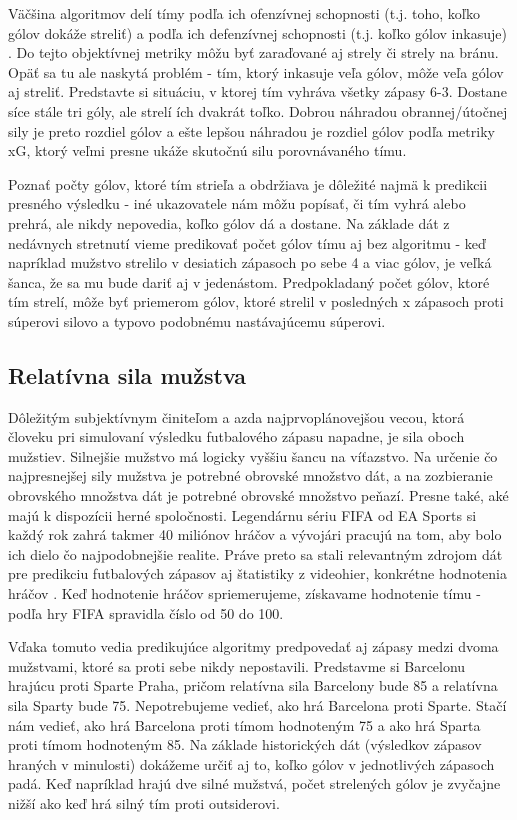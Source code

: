 \documentclass[10pt,twoside,slovak,a4paper]{article}
\begin{document}
Väčšina algoritmov delí tímy podľa ich ofenzívnej schopnosti (t.j. toho, koľko gólov dokáže streliť) a podľa ich defenzívnej schopnosti (t.j. koľko gólov inkasuje) \cite{dixon1997modelling} \cite{razali2017predicting}. Do tejto objektívnej metriky môžu byť zaraďované aj strely či strely na bránu. Opäť sa tu ale naskytá problém - tím, ktorý inkasuje veľa gólov, môže veľa gólov aj streliť. Predstavte si situáciu, v ktorej tím vyhráva všetky zápasy 6-3. Dostane síce stále tri góly, ale strelí ích dvakrát toľko. Dobrou náhradou obrannej/útočnej sily je preto rozdiel gólov a ešte lepšou náhradou je rozdiel gólov podľa metriky xG, ktorý veľmi presne ukáže skutočnú silu porovnávaného tímu.

Poznať počty gólov, ktoré tím strieľa a obdržiava je dôležité najmä k predikcii presného výsledku - iné ukazovatele nám môžu popísať, či tím vyhrá alebo prehrá, ale nikdy nepovedia, koľko gólov dá a dostane. Na základe dát z nedávnych stretnutí vieme predikovať počet gólov tímu aj bez algoritmu - keď napríklad mužstvo strelilo v desiatich zápasoch po sebe 4 a viac gólov, je veľká šanca, že sa mu bude dariť aj v jedenástom. Predpokladaný počet gólov, ktoré tím strelí, môže byť priemerom gólov, ktoré strelil v posledných x zápasoch proti súperovi silovo a typovo podobnému nastávajúcemu súperovi.

\subsection{Relatívna sila mužstva}

Dôležitým subjektívnym činiteľom a azda najprvoplánovejšou vecou, ktorá človeku pri simulovaní výsledku futbalového zápasu napadne, je sila oboch mužstiev. Silnejšie mužstvo má logicky vyššiu šancu na víťazstvo. Na určenie čo najpresnejšej sily mužstva je potrebné obrovské množstvo dát, a na zozbieranie obrovského množstva dát je potrebné obrovské množstvo peňazí. Presne také, aké majú k dispozícii herné spoločnosti. Legendárnu sériu FIFA od EA Sports si každý rok zahrá takmer 40 miliónov hráčov a vývojári pracujú na tom, aby bolo ich dielo čo najpodobnejšie realite. Práve preto sa stali relevantným zdrojom dát pre predikciu futbalových zápasov aj štatistiky z videohier, konkrétne hodnotenia hráčov \cite{shin2014novel}. Keď hodnotenie hráčov spriemerujeme, získavame hodnotenie tímu - podľa hry FIFA spravidla číslo od 50 do 100.

Vďaka tomuto vedia predikujúce algoritmy predpovedať aj zápasy medzi dvoma mužstvami, ktoré sa proti sebe nikdy nepostavili. Predstavme si Barcelonu hrajúcu proti Sparte Praha, pričom relatívna sila Barcelony bude 85 a relatívna sila Sparty bude 75. Nepotrebujeme vedieť, ako hrá Barcelona proti Sparte. Stačí nám vedieť, ako hrá Barcelona proti tímom hodnoteným 75 a ako hrá Sparta proti tímom hodnoteným 85. Na základe historických dát (výsledkov zápasov hraných v minulosti) dokážeme určiť aj to, koľko gólov v jednotlivých zápasoch padá. Keď napríklad hrajú dve silné mužstvá, počet strelených gólov je zvyčajne nižší ako keď hrá silný tím proti outsiderovi.
\end{document}
